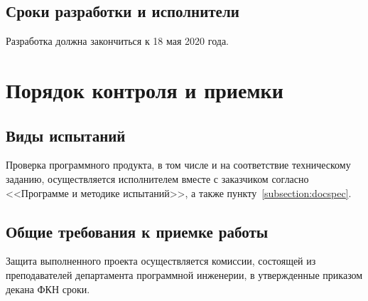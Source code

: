 \documentclass[techtask]{espd}
\begin{document}
\subsection{Сроки разработки и исполнители}
Разработка должна закончиться к 18 мая 2020 года.

\section{Порядок контроля и приемки}
\subsection{Виды испытаний}
Проверка программного продукта, в том числе и на соответствие техническому заданию, осуществляется исполнителем вместе с заказчиком согласно <<Программе и методике испытаний>>, а также пункту~\ref{subsection:docspec}.

\subsection{Общие требования к приемке работы}
Защита выполненного проекта осуществляется комиссии, состоящей из преподавателей департамента программной инженерии, в утвержденные приказом декана ФКН сроки.


\end{document}
